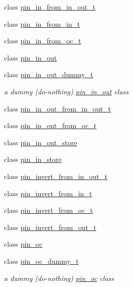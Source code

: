 \begin{DoxyCompactItemize}
class \hyperlink{classhwlib_1_1pin__in__from__in__out__t}{pin\+\_\+in\+\_\+from\+\_\+in\+\_\+out\+\_\+t}
\item 
class \hyperlink{classhwlib_1_1pin__in__from__in__t}{pin\+\_\+in\+\_\+from\+\_\+in\+\_\+t}
\item 
class \hyperlink{classhwlib_1_1pin__in__from__oc__t}{pin\+\_\+in\+\_\+from\+\_\+oc\+\_\+t}
\item 
class \hyperlink{classhwlib_1_1pin__in__out}{pin\+\_\+in\+\_\+out}
\item 
class \hyperlink{classhwlib_1_1pin__in__out__dummy__t}{pin\+\_\+in\+\_\+out\+\_\+dummy\+\_\+t}
\begin{DoxyCompactList}\small\item\em a dummy (do-\/nothing) \hyperlink{classhwlib_1_1pin__in__out}{pin\+\_\+in\+\_\+out} class \end{DoxyCompactList}\item 
class \hyperlink{classhwlib_1_1pin__in__out__from__in__out__t}{pin\+\_\+in\+\_\+out\+\_\+from\+\_\+in\+\_\+out\+\_\+t}
\item 
class \hyperlink{classhwlib_1_1pin__in__out__from__oc__t}{pin\+\_\+in\+\_\+out\+\_\+from\+\_\+oc\+\_\+t}
\item 
class \hyperlink{classhwlib_1_1pin__in__out__store}{pin\+\_\+in\+\_\+out\+\_\+store}
\item 
class \hyperlink{classhwlib_1_1pin__in__store}{pin\+\_\+in\+\_\+store}
\item 
class \hyperlink{classhwlib_1_1pin__invert__from__in__out__t}{pin\+\_\+invert\+\_\+from\+\_\+in\+\_\+out\+\_\+t}
\item 
class \hyperlink{classhwlib_1_1pin__invert__from__in__t}{pin\+\_\+invert\+\_\+from\+\_\+in\+\_\+t}
\item 
class \hyperlink{classhwlib_1_1pin__invert__from__oc__t}{pin\+\_\+invert\+\_\+from\+\_\+oc\+\_\+t}
\item 
class \hyperlink{classhwlib_1_1pin__invert__from__out__t}{pin\+\_\+invert\+\_\+from\+\_\+out\+\_\+t}
\item 
class \hyperlink{classhwlib_1_1pin__oc}{pin\+\_\+oc}
\item 
class \hyperlink{classhwlib_1_1pin__oc__dummy__t}{pin\+\_\+oc\+\_\+dummy\+\_\+t}
\begin{DoxyCompactList}\small\item\em a dummy (do-\/nothing) \hyperlink{classhwlib_1_1pin__oc}{pin\+\_\+oc} class \end{DoxyCompactList}\item 

\end{DoxyCompactItemize}
